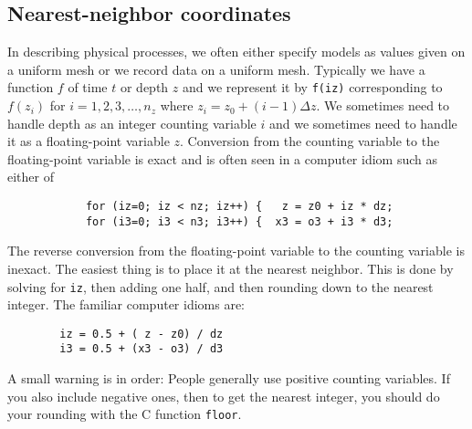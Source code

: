 \subsection{Nearest-neighbor coordinates}
In describing physical processes,
we often either specify models as values given on a uniform mesh
or we record data on a uniform mesh.
Typically we have
a function $f$ of time $t$ or depth $z$
and we represent it by {\tt f(iz)}
corresponding to $f(z_i)$ for $i=1,2,3,\ldots, n_z$
where $z_i = z_0+ (i-1)\Delta z$.
We sometimes need to handle depth as
an integer counting variable $i$
and we sometimes need to handle it as
a floating-point variable $z$.
Conversion from the counting variable to the floating-point variable
is exact and is often seen in a computer idiom
such as either of \begin{verbatim}
            for (iz=0; iz < nz; iz++) {   z = z0 + iz * dz;
            for (i3=0; i3 < n3; i3++) {  x3 = o3 + i3 * d3;
\end{verbatim}
The reverse conversion from the floating-point variable
to the counting variable is inexact.
The easiest thing is to place it at the nearest neighbor.
This is done by solving for {\tt iz}, then adding one half,
and then rounding down to the nearest integer.
The familiar computer idioms are:\begin{verbatim}
        iz = 0.5 + ( z - z0) / dz
        i3 = 0.5 + (x3 - o3) / d3
\end{verbatim}
A small warning is in order:
People generally use positive counting variables.
If you also include negative ones,
then to get the nearest integer,
you should do your rounding with the
C function \texttt{floor}.


